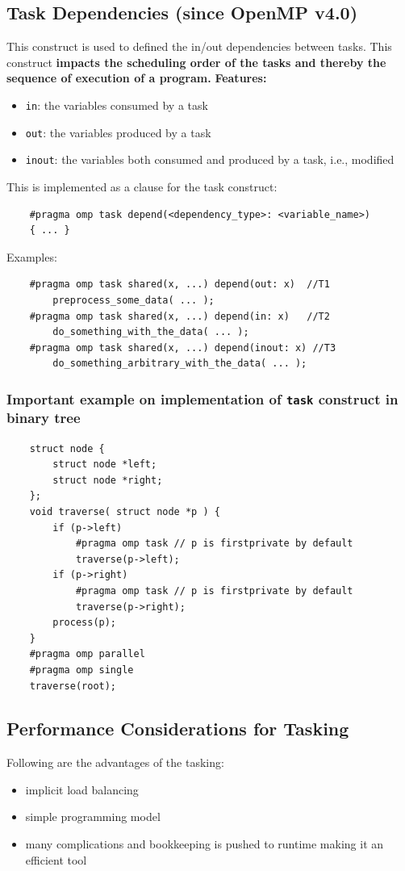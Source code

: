 \documentclass[12pt, a4paper]{report}
\begin{document}
\subsection{Task Dependencies (since OpenMP v4.0)}
This construct is used to defined the in/out dependencies between tasks. This construct {\bfseries{impacts the scheduling order of the tasks and thereby the
sequence of execution of a program.}}
{\bfseries{Features:}}
\begin{itemize}
    \item \verb$in$: the variables consumed by a task
    \item \verb$out$: the variables produced by a task
    \item \verb$inout$: the variables both consumed and produced by a task, i.e., modified
\end{itemize}
This is implemented as a clause for the task construct:
\begin{verbatim}
    #pragma omp task depend(<dependency_type>: <variable_name>)
    { ... }
\end{verbatim}
Examples:
\begin{verbatim}
    #pragma omp task shared(x, ...) depend(out: x)  //T1
        preprocess_some_data( ... );
    #pragma omp task shared(x, ...) depend(in: x)   //T2
        do_something_with_the_data( ... );
    #pragma omp task shared(x, ...) depend(inout: x) //T3
        do_something_arbitrary_with_the_data( ... );
\end{verbatim}

\subsubsection{Important example on implementation of \texttt{task} construct in binary tree}
\begin{verbatim}
    struct node {
        struct node *left;
        struct node *right;
    };
    void traverse( struct node *p ) {
        if (p->left)
            #pragma omp task // p is firstprivate by default
            traverse(p->left);
        if (p->right)
            #pragma omp task // p is firstprivate by default
            traverse(p->right);
        process(p);
    }
    #pragma omp parallel
    #pragma omp single
    traverse(root);
\end{verbatim}

\subsection{Performance Considerations for Tasking}
Following are the advantages of the tasking:
\begin{itemize}
    \item implicit load balancing
    \item simple programming model
    \item many complications and bookkeeping is pushed to runtime making it an efficient tool
\end{itemize}
\end{document}
